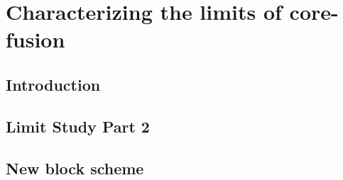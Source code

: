 \chapter{Characterizing the limits of core-fusion}

\section{Introduction}\label{sect:introduction-chapter3}
\section{Limit Study Part 2}

\section{New block scheme}

%
%
%